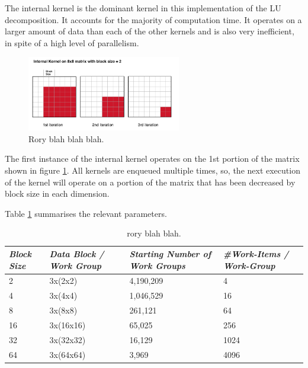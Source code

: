 \par{The internal kernel is the dominant kernel in this implementation of the LU decomposition. 
    It accounts for the majority of computation time. It operates on a larger amount of data 
    than each of the other kernels and is also very inefficient, in spite of a high level of parallelism.}

\begin{figure}[!h]
    \centering
    \includegraphics[width=0.6\textwidth]{figures/InternalKernel2.png}
    \caption{Rory blah blah blah.}
    \label{InternalKernel2}
\end{figure}

\par{The first instance of the internal kernel operates on the 1st portion of the matrix shown in figure \ref{InternalKernel2}. 
    All kernels are enqueued multiple times, so, the next execution of the kernel will operate on 
    a portion of the matrix that has been decreased by block size in each dimension.}

\par{Table \ref{tab:lu3} summarises the relevant parameters.}

\begin{table}[!h]
    \centering
    \begin{tabular}{| l | l | l | l |}
    \hline
    \emph{Block Size} & \emph{Data Block / Work Group} & \emph{Starting Number of Work Groups} & \emph{\#Work-Items / Work-Group} \\ \hline
    2 & 3x(2x2) & 4,190,209 & 4 \\ \hline
    4 & 3x(4x4) & 1,046,529 & 16 \\ \hline
    8 & 3x(8x8) & 261,121 & 64 \\ \hline
    16 & 3x(16x16) & 65,025 & 256 \\ \hline
    32 & 3x(32x32) & 16,129 & 1024 \\ \hline
    64 & 3x(64x64) & 3,969 & 4096 \\ \hline
    \end{tabular}
    \caption{rory blah blah.}
    \label{tab:lu3}
\end{table}

